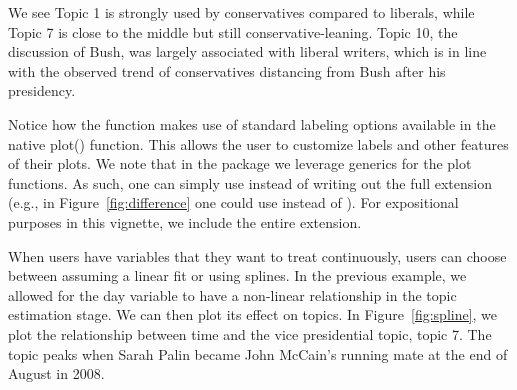 \documentclass[nojss]{jss}
\begin{document}
We see Topic 1 is strongly used by conservatives compared to liberals, while Topic 7 is close to the middle but still conservative-leaning. Topic 10, the discussion of Bush, was largely associated with liberal writers, which is in line with the observed trend of conservatives distancing from Bush after his presidency.

Notice how the function makes use of standard labeling options available in the native plot() function. This allows the user to customize labels and other features of their plots. We note that in the package we leverage generics for the plot functions. As such, one can simply use  instead of writing out the full extension (e.g., in Figure~\ref{fig:difference} one could use  instead of ). For expositional purposes in this vignette, we include the entire extension.

When users have variables that they want to treat continuously, users can choose between assuming a linear fit or using splines. In the previous example, we allowed for the day variable to have a non-linear relationship in the topic estimation stage. We can then plot its effect on topics. In Figure~\ref{fig:spline}, we plot the relationship between time and the vice presidential topic, topic 7.  The topic peaks when Sarah Palin became John McCain's running mate at the end of August in 2008.
\end{document}
